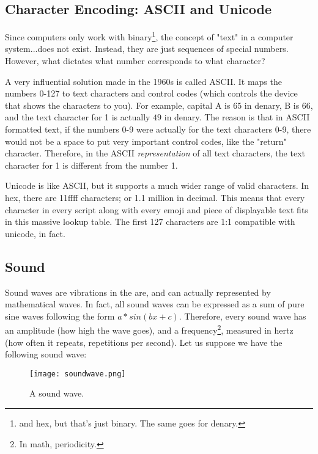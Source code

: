 \documentclass[../main.tex]{subfiles}
\begin{document}
\subsection{Character Encoding: ASCII and Unicode}

Since computers only work with binary\footnote{and hex, but that's just binary. The same goes for denary.}, the concept of "text" in a computer system...does not exist. Instead, they are just sequences of special numbers. However, what dictates what number corresponds to what character?

A very influential solution made in the 1960s is called ASCII. It maps the numbers 0-127 to text characters and control codes (which controls the device that shows the characters to you). For example, capital A is $65$ in denary, B is 66, and the text character for 1 is actually $49$ in denary. The reason is that in ASCII formatted text, if the numbers 0-9 were actually for the text characters 0-9, there would not be a space to put very important control codes, like the "return" character. Therefore, in the ASCII \emph{representation} of all text characters, the text character for 1 is different from the number 1.

Unicode is like ASCII, but it supports a much wider range of valid characters. In hex, there are 11ffff characters; or 1.1 million in decimal. This means that every character in every script along with every emoji and piece of displayable text fits in this massive lookup table. The first 127 characters are 1:1 compatible with unicode, in fact.

\subsection{Sound}

Sound waves are vibrations in the are, and can actually represented by mathematical waves. In fact, all sound waves can be expressed as a sum of pure sine waves following the form $a*sin(bx+c)$. Therefore, every sound wave has an amplitude (how high the wave goes), and a frequency\footnote{In math, periodicity.}, measured in hertz (how often it repeats, repetitions per second). Let us suppose we have the following sound wave:

\begin{figure}[H]
    \centering
    \texttt{[image: soundwave.png]}
    \caption{A sound wave.}
    \label{fig:soundwave}
\end{figure}
\end{document}
